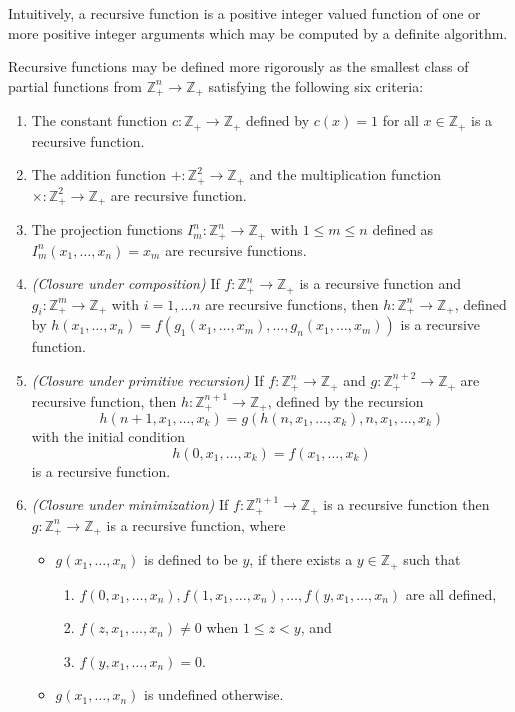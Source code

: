 \documentclass[12pt]{article}
\begin{document}
Intuitively, a recursive function is a positive integer valued function of one or more positive integer arguments which may be computed by a definite algorithm.

Recursive functions may be defined more rigorously as the smallest class of partial functions from $\mathbb{Z}_+^n \to \mathbb{Z}_+$ satisfying the following six criteria:

\begin{enumerate}
\item The constant function $c: \mathbb{Z}_+ \to \mathbb{Z}_+$ defined by $c(x) = 1$ for all $x \in \mathbb{Z}_+$ is a recursive function.
\item The addition function $+: \mathbb{Z}_+^2 \to \mathbb{Z}_+$ and the multiplication function $\times: \mathbb{Z}_+^2 \to \mathbb{Z}_+$  are recursive function.
\item The projection functions $I^n_m \colon \mathbb{Z}_+^n \to \mathbb{Z}_+$ with $1 \le m \le n$ defined as $I^n_m (x_1, \ldots, x_n) = x_m$ are recursive functions.
\item {\it (Closure under composition)} If $f \colon \mathbb{Z}_+^n \to \mathbb{Z}_+$ is a recursive function and $g_i \colon \mathbb{Z}_+^m \to \mathbb{Z}_+$ with $i = 1, \ldots n$ are recursive functions, then $h \colon \mathbb{Z}_+^n \to \mathbb{Z}_+$, defined by $h(x_1, \ldots, x_n) = f(g_1(x_1, \ldots, x_m), \ldots, g_n(x_1, \ldots, x_m))$ is a recursive function.
\item {\it (Closure under primitive recursion)} If $f \colon \mathbb{Z}_+^n \to \mathbb{Z}_+$ and $g \colon \mathbb{Z}_+^{n+2} \to \mathbb{Z}_+$ are recursive function, then $h \colon \mathbb{Z}_+^{n+1} \to \mathbb{Z}_+$, defined by the recursion
 $$h(n+1,x_1,\ldots,x_{k}) = g(h(n,x_1,\ldots,x_k),n,x_1,\ldots, x_k)$$
with the initial condition
 $$h(0,x_1,\ldots,x_k) = f(x_1,\ldots,x_k)$$
is a recursive function.
\item {\it (Closure under minimization)} If $f \colon \mathbb{Z}_+^{n+1} \to \mathbb{Z}_+$ is a recursive function then $g \colon \mathbb{Z}_+^n \to \mathbb{Z}_+$ is a recursive function, where
\begin{itemize}
\item $g(x_1, \ldots, x_n)$ is defined to be $y$, if there exists a $y \in \mathbb{Z}_+$ such that 
\begin{enumerate}
\item $f(0, x_1, \ldots, x_n), f(1, x_1, \ldots, x_n), \ldots, f(y, x_1, \ldots, x_n)$ are all defined, 
\item $f(z, x_1, \ldots, x_n) \ne 0$ when $1 \le z <y$, and 
\item $f(y, x_1, \ldots, x_n) = 0$.
\end{enumerate}
\item $g(x_1, \ldots, x_n)$ is undefined otherwise.
\end{itemize}
\end{enumerate}
\end{document}
